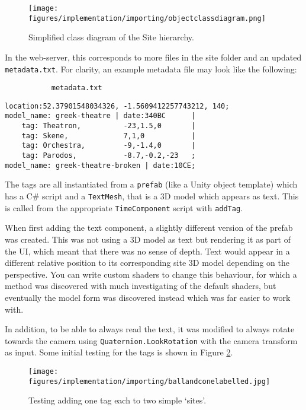 \documentclass[12pt, a4paper]{article}
\begin{document}
\begin{figure}[h]
    \centering
    \texttt{[image: figures/implementation/importing/objectclassdiagram.png]}
        \caption{Simplified class diagram of the Site hierarchy.}
        \label{fig:hierarchydiagram}
\end{figure}

In the web-server, this corresponds to more files in the site folder and an updated \verb|metadata.txt|. For clarity, an example metadata file may look like the following: 
\par
\verb|           metadata.txt|
\begin{mdframed}[leftmargin=50pt, rightmargin=50pt]
    \begin{verbatim}
location:52.37901548034326, -1.5609412257743212, 140;
model_name: greek-theatre | date:340BC      |
    tag: Theatron,          -23,1.5,0       |
    tag: Skene,             7,1,0           | 
    tag: Orchestra,         -9,-1.4,0       | 
    tag: Parodos,           -8.7,-0.2,-23   ;
model_name: greek-theatre-broken | date:10CE;\end{verbatim}
\end{mdframed}

The tags are all instantiated from a \verb|prefab| (like a Unity object template) which has a C\# script and a \verb|TextMesh|, that is a 3D model which appears as text. This is called from the appropriate \verb|TimeComponent| script with \verb|addTag|.

When first adding the text component, a slightly different version of the prefab was created. This was not using a 3D model as text but rendering it as part of the UI, which meant that there was no sense of depth. Text would appear in a different relative position to its corresponding site 3D model depending on the perspective. You can write custom shaders to change this behaviour, for which a method was discovered with much investigating of the default shaders, but eventually the model form was discovered instead which was far easier to work with. 

In addition, to be able to always read the text, it was modified to always rotate towards the camera using \verb|Quaternion.LookRotation| with the camera transform as input. Some initial testing for the tags is shown in Figure 
\ref{fig:ballconetag}.
\begin{figure}[h]
    \centering
    \texttt{[image: figures/implementation/importing/ballandconelabelled.jpg]}
        \caption{Testing adding one tag each to two simple `sites'.}
        \label{fig:ballconetag}
\end{figure}
\end{document}
